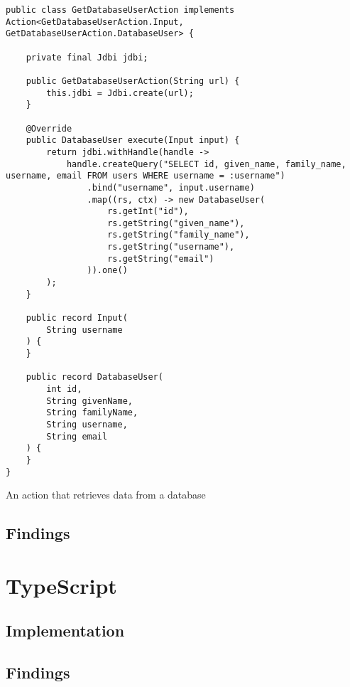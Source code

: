 \begin{listing}[H]
\begin{verbatim}
public class GetDatabaseUserAction implements Action<GetDatabaseUserAction.Input, GetDatabaseUserAction.DatabaseUser> {
    
    private final Jdbi jdbi;
    
    public GetDatabaseUserAction(String url) {
        this.jdbi = Jdbi.create(url);
    }
    
    @Override
    public DatabaseUser execute(Input input) {
        return jdbi.withHandle(handle ->
            handle.createQuery("SELECT id, given_name, family_name, username, email FROM users WHERE username = :username")
                .bind("username", input.username)
                .map((rs, ctx) -> new DatabaseUser(
                    rs.getInt("id"),
                    rs.getString("given_name"),
                    rs.getString("family_name"),
                    rs.getString("username"),
                    rs.getString("email")
                )).one()
        );
    }
    
    public record Input(
        String username
    ) {
    }
    
    public record DatabaseUser(
        int id,
        String givenName,
        String familyName,
        String username,
        String email
    ) {
    }
}
\end{verbatim}
\caption{An action that retrieves data from a database}
\end{listing}

\subsection{Findings}

\section{TypeScript}
\subsection{Implementation}
\subsection{Findings}
